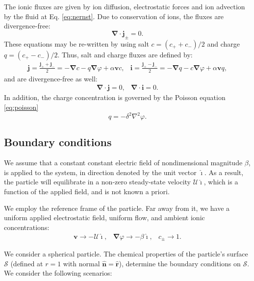 \documentclass[10pt]{ijnam}
\newcommand\Laplacian{\nabla^2}
\newcommand\bnabla{\boldsymbol{\nabla}}
\newcommand\bv{\boldsymbol{v}}
\newcommand\bn{\boldsymbol{\hat{n}}}
\newcommand\bj{\boldsymbol{j}}
\newcommand\bi{\boldsymbol{i}}
\newcommand\br{\boldsymbol{r}}
\newcommand\brhat{\hat{\br}}
\newcommand\cU{\mathscr{U}}
\newcommand\ui{\boldsymbol{\hat{\imath}}}
\begin{document}
The ionic fluxes are given by ion diffusion, electrostatic forces and ion advection by the fluid
at Eq. \eqref{eq:nernst}. Due to conservation of ions, the fluxes are divergence-free:
\begin{equation*}
\bnabla \cdot \bj_\pm = 0.
\end{equation*}
These equations may be re-written by using salt $c = (c_+ + c_-)/2$ and charge $q = (c_+ - c_-)/2$.
Thus, salt and charge fluxes are defined by:
\begin{equation}\label{eq:fluxes}\begin{array}{cc}
  \bj = \frac{\bj_+ + \bj_-}{2} = -\bnabla c - q \bnabla \varphi + \alpha \bv c, & 
  \bi = \frac{\bj_+ - \bj_-}{2} = -\bnabla q - c \bnabla \varphi + \alpha \bv q,
\end{array}\end{equation}
and are divergence-free as well:
\begin{equation}\label{eq:zero_flux}\begin{array}{cc}
\bnabla \cdot \bj = 0, & 
\bnabla \cdot \bi = 0. 
\end{array}\end{equation}
In addition, the charge concentration is governed by the Poisson equation \eqref{eq:poisson}
\begin{equation}
q = -\delta^2 \Laplacian \varphi.
\end{equation}

\subsection{Boundary conditions}
We assume that a constant constant electric field of nondimensional magnitude $\beta$,
is applied to the system, in direction denoted by the unit vector $\ui$.
As a result, the particle will equilibrate in 
a non-zero steady-state velocity $\cU \ui$, which is
a function of the applied field, and is not known a priori.

We employ the reference frame of the particle.
Far away from it, we have a uniform applied electrostatic field, uniform flow,
and ambient ionic concentrations:
\begin{equation}\label{eq:bndcond_inf}\begin{array}{ccc}
\bv \rightarrow -\cU \ui, &
\bnabla \varphi \rightarrow -\beta\ui, &
 c_\pm \rightarrow 1.
\end{array}\end{equation}

We consider a spherical particle.
The chemical properties of the particle's surface $\mathcal{S}$ (defined at $r=1$ 
with normal $\bn = \brhat$), determine the boundary conditions on $\mathcal{S}$.
We consider the following scenarios:
\end{document}
